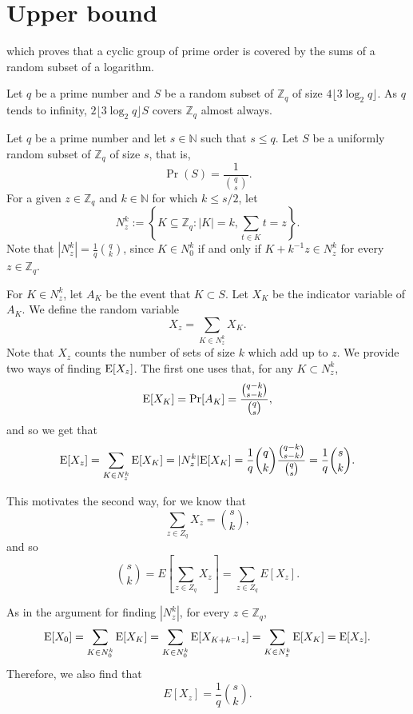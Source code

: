 \section{Upper bound}\label{sec:results:upperbound}

which proves that a cyclic group of prime order is covered by the sums of a random subset of a logarithm.  
\begin{lemma}\label{lem:sumset}
    Let $q$ be a prime number and $S$ be a random subset of $\mathbb{Z}_q$ of size $4\lfloor3\log_2 q\rfloor$. As $q$ tends to infinity, $2\lfloor3\log_2 q\rfloor S$ covers $\mathbb{Z}_q$ almost always. 
\end{lemma}

Let $q$ be a prime number and let $s \in \mathbb{N}$ such that $s\leq q$. Let $S$ be a uniformly random subset of $\mathbb{Z}_q$ of size $s$, that is, 
\[\Pr(S) = \frac{1}{\binom{q}{s}}.\]
For a given $z \in \mathbb{Z}_q$ and $k \in \mathbb{N}$ for which $k \leq s/2$, let 
\[N_z^k := \left\{K \subseteq \mathbb{Z}_q: |K| = k, \sum_{t \in K} t = z\right\}.\]
Note that $|N_z^k| = \frac{1}{q}{\binom{q}{k}}$, since $K \in N_0^k$ if and only if $K + k^{-1}z \in N_z^k$ for every $z \in \mathbb{Z}_q$.\par
For $K \in N_z^k$, let $A_K$ be the event that $K \subset S$. Let $X_K$ be the indicator variable of $A_K$.
We define the random variable 
\[X_z = \sum_{K \in N_z^k} X_K.\]
Note that $X_z$ counts the number of sets of size $k$ which add up to $z$. We provide two ways of finding $\mathrm{E}[X_z]$. The first one uses that, for any $K \subset N^k_z$, 
\[\mathrm{E}[X_K] = \mathrm{Pr}[A_K] = \frac{\binom{q - k}{s - k}}{\binom{q}{s}},\]
and so we get that
\begin{align*}
    \mathrm{E}[X_z] = \sum_{K \in N_z^k} \mathrm{E}[X_K] = |N_z^k|\mathrm{E}[X_K] = \frac{1}{q}{\binom{q}{k}}\frac{\binom{q - k}{s - k}}{\binom{q}{s}} = \frac{1}{q} {\binom{s}{k}}.
\end{align*}
\par
This motivates the second way, for we know that 
\[\sum_{z \in Z_q} X_z = {\binom{s}{k}},\]
and so
\[\binom{s}{k} = E\left[\sum_{z \in Z_q} X_z\right] =  \sum_{z \in Z_q} E[X_z].\]\par
As in the argument for finding $|N_z^k|$, for every $z \in \mathbb{Z}_q$, 
\[\mathrm{E}[X_0] = \sum_{K \in N_0^k}\mathrm{E}[X_K] = \sum_{K \in N_0^k} \mathrm{E}[X_{K + k^{-1}z}] = \sum_{K \in N_z^k} \mathrm{E}[X_K] = \mathrm{E}[X_z].\]
Therefore, we also find that
\begin{equation}\label{eq:upperbound:expected}
E[X_z] = \frac{1}{q} {\binom{s}{k}}.
\end{equation}
